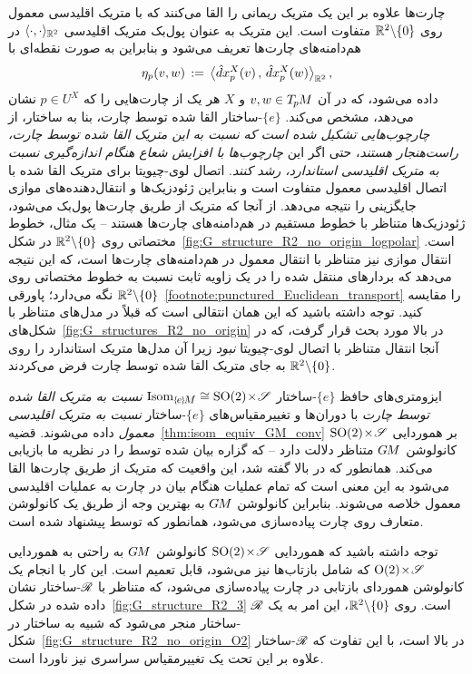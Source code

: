 چارت‌ها علاوه بر این یک متریک ریمانی را القا می‌کنند که با متریک اقلیدسی معمول روی $\mathbb{R}^2 \backslash \{0\}$ متفاوت است.
این متریک به عنوان پول‌بک متریک اقلیدسی $\langle \cdot,\cdot \rangle_{\mathbb{R}^2}$ در هم‌دامنه‌های چارت‌ها تعریف می‌شود و بنابراین به صورت نقطه‌ای با
\begin{align}
	\eta_p(v,w) \,:=\, \big\langle \hat{d}x^X_p(v) \,,\, \hat{d}x^X_p(w) \big\rangle_{\mathbb{R}^2} \,,
\end{align}
داده می‌شود، که در آن $v,w \in T_{\mkern-1.5mu p}\mkern-.5muM$ و $X$ هر یک از چارت‌هایی را که $p\in U^X$ نشان می‌دهد، مشخص می‌کند.
$\{e\}$-ساختار القا شده توسط چارت، بنا به ساختار، از \emph{چارچوب‌هایی تشکیل شده است که نسبت به این متریک القا شده توسط چارت، راست‌هنجار هستند}، حتی اگر این \emph{چارچوب‌ها با افزایش شعاع هنگام اندازه‌گیری نسبت به متریک اقلیدسی استاندارد، رشد کنند}.
اتصال لوی-چیویتا برای متریک القا شده با اتصال اقلیدسی معمول متفاوت است و بنابراین ژئودزیک‌ها و انتقال‌دهنده‌های موازی جایگزینی را نتیجه می‌دهد.
از آنجا که متریک از طریق چارت‌ها پول‌بک می‌شود، ژئودزیک‌ها متناظر با خطوط مستقیم در هم‌دامنه‌های چارت‌ها هستند -- یک مثال، خطوط مختصاتی روی $\mathbb{R}^2 \backslash \{0\}$ در شکل~\ref{fig:G_structure_R2_no_origin_logpolar} است.
انتقال موازی نیز متناظر با انتقال معمول در هم‌دامنه‌های چارت‌ها است، که این نتیجه می‌دهد که بردارهای منتقل شده را در یک زاویه ثابت نسبت به خطوط مختصاتی روی $\mathbb{R}^2 \backslash \{0\}$ نگه می‌دارد؛ پاورقی~\ref{footnote:punctured_Euclidean_transport} را مقایسه کنید.
توجه داشته باشید که این همان انتقالی است که قبلاً در مدل‌های متناظر با شکل‌های~\ref{fig:G_structures_R2_no_origin} در بالا مورد بحث قرار گرفت، که در آنجا انتقال متناظر با اتصال لوی-چیویتا \emph{نبود} زیرا آن مدل‌ها متریک استاندارد را روی $\mathbb{R}^2 \backslash \{0\}$ به جای متریک القا شده توسط چارت فرض می‌کردند.

ایزومتری‌های حافظ $\{e\}$-ساختار $\IsomeM \cong {\SO2 \!\times\! \Scale}$ \emph{نسبت به متریک القا شده توسط چارت} با دوران‌ها و تغییرمقیاس‌های $\{e\}$-ساختار \emph{نسبت به متریک اقلیدسی معمول} داده می‌شوند.
قضیه~\ref{thm:isom_equiv_GM_conv} بر هموردایی ${\operatorname{SO}(2) \!\times\! \mathscr{S}}$ کانولوشن $G\mkern-1.4muM$ متناظر دلالت دارد -- که گزاره بیان شده توسط \citet{esteves2017polar} را در نظریه ما بازیابی می‌کند.
همانطور که در بالا گفته شد، این واقعیت که متریک از طریق چارت‌ها القا می‌شود به این معنی است که تمام عملیات هنگام بیان در چارت به عملیات اقلیدسی معمول خلاصه می‌شوند.
بنابراین کانولوشن $G\mkern-1.4muM$ به بهترین وجه از طریق یک کانولوشن متعارف روی چارت پیاده‌سازی می‌شود، همانطور که توسط \citet{esteves2017polar} پیشنهاد شده است.

توجه داشته باشید که هموردایی ${\operatorname{SO}(2) \!\times\! \mathscr{S}}$ کانولوشن $G\mkern-1.4muM$ به راحتی به هموردایی ${\operatorname{O}(2) \!\times\! \mathscr{S}}$ که شامل بازتاب‌ها نیز می‌شود، قابل تعمیم است.
این کار با انجام یک کانولوشن هموردای بازتابی در چارت پیاده‌سازی می‌شود، که متناظر با $\mathscr{R}$-ساختار نشان داده شده در شکل~\ref{fig:G_structure_R2_3} است.
روی $\mathbb{R}^2 \backslash \{0\}$، این امر به یک $\mathscr{R}$-ساختار منجر می‌شود که شبیه به ساختار در شکل~\ref{fig:G_structure_R2_no_origin_O2} در بالا است، با این تفاوت که $\mathscr{R}$-ساختار علاوه بر این تحت یک تغییرمقیاس سراسری نیز ناوردا است.